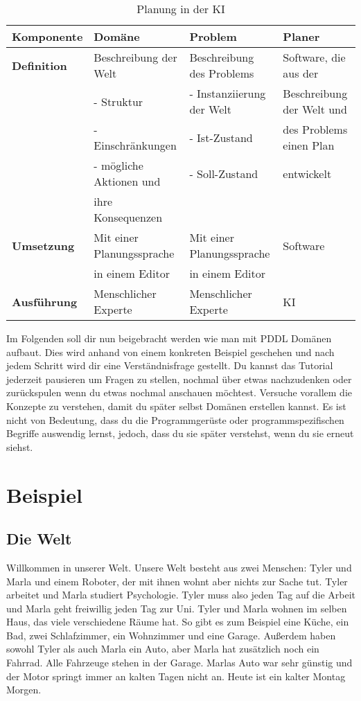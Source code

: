 \documentclass[koma,DIV=1,BCOR=1mm]{article}
\begin{document}
\begin{table}[htb]
\caption{Planung in der KI}
\centering
\footnotesize
\begin{tabular}{l|lll}
\textbf{Komponente} & \textbf{Domäne} & \textbf{Problem} & \textbf{Planer}\\
\hline
\textbf{Definition} & Beschreibung der Welt & Beschreibung des Problems & Software, die aus der\\
 & - Struktur & - Instanziierung der Welt & Beschreibung der Welt und\\
 & - Einschränkungen & - Ist-Zustand & des Problems einen Plan\\
 & - mögliche Aktionen und & - Soll-Zustand & entwickelt\\
 & ihre Konsequenzen &  & \\
\textbf{Umsetzung} & Mit einer Planungssprache & Mit einer Planungssprache & Software\\
 & in einem Editor & in einem Editor & \\
\textbf{Ausführung} & Menschlicher Experte & Menschlicher Experte & KI\\
\end{tabular}
\end{table}


Im Folgenden soll dir nun beigebracht werden wie man mit PDDL Domänen
aufbaut. Dies wird anhand von einem konkreten Beispiel geschehen und
nach jedem Schritt wird dir eine Verständnisfrage gestellt. Du kannst
das Tutorial jederzeit pausieren um Fragen zu stellen, nochmal über
etwas nachzudenken oder zurückspulen wenn du etwas nochmal anschauen
möchtest. Versuche vorallem die Konzepte zu verstehen, damit du später
selbst Domänen erstellen kannst. Es ist nicht von Bedeutung, dass du
die Programmgerüste oder programmspezifischen Begriffe auswendig
lernst, jedoch, dass du sie später verstehst, wenn du sie erneut
siehst.

\section{Beispiel}
\label{sec-2}
\subsection{Die Welt}
\label{sec-2-1}
Willkommen in unserer Welt. Unsere Welt besteht aus zwei Menschen:
Tyler und Marla und einem Roboter, der mit ihnen wohnt aber nichts zur
Sache tut. Tyler arbeitet und Marla studiert Psychologie. Tyler muss
also jeden Tag auf die Arbeit und Marla geht freiwillig jeden Tag zur
Uni. Tyler und Marla wohnen im selben Haus, das viele verschiedene
Räume hat. So gibt es zum Beispiel eine Küche, ein Bad, zwei
Schlafzimmer, ein Wohnzimmer und eine Garage. Außerdem haben sowohl
Tyler als auch Marla ein Auto, aber Marla hat zusätzlich noch ein
Fahrrad. Alle Fahrzeuge stehen in der Garage. Marlas Auto war sehr
günstig und der Motor springt immer an kalten Tagen nicht an. Heute
ist ein kalter Montag Morgen.
\end{document}
